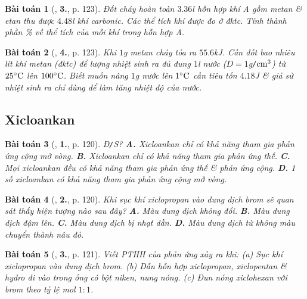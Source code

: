 \documentclass{article}
\numberwithin{equation}{section}
\newtheorem{baitoan}{Bài toán}[section]
\begin{document}
\begin{baitoan}[\cite{SGK_Hoa_Hoc_11_co_ban}, \textbf{3.}, p. 123]
	Đốt cháy hoàn toàn $3.36$\emph{l} hỗn hợp khí A gồm metan \& etan thu được $4.48$\emph{l} khí carbonic. Các thể tích khí được đo ở đktc. Tính thành phần \% về thể tích của mỗi khí trong hỗn hợp A.
\end{baitoan}

\begin{baitoan}[\cite{SGK_Hoa_Hoc_11_co_ban}, \textbf{4.}, p. 123]
	Khi $1$\emph{g} metan cháy tỏa ra $55.6$\emph{kJ}. Cần đốt bao nhiêu lít khí metan (đktc) để lượng nhiệt sinh ra đủ đung $1$\emph{l} nước ($D = 1$\emph{g\texttt{/}$\rm cm^3$}) từ $25^\circ{\rm C}$ lên $100^\circ{\rm C}$. Biết muốn nâng $1$\emph{g} nước lên $1^\circ{\rm C}$ cần tiêu tốn $4.18$\emph{J} \& giả sử nhiệt sinh ra chỉ dùng để làm tăng nhiệt độ của nước.
\end{baitoan}


\subsection{Xicloankan}

\begin{baitoan}[\cite{SGK_Hoa_Hoc_11_co_ban}, \textbf{1.}, p. 120]
	\emph{Đ\texttt{/}S}? {\bf A.} Xicloankan chỉ có khả năng tham gia phản ứng cộng mở vòng. {\bf B.} Xicloankan chỉ có khả năng tham gia phản ứng thế. {\bf C.} Mọi xicloankan đều có khả năng tham gia phản ứng thế \& phản ứng cộng. {\bf D.} 1 số xicloankan có khả năng tham gia phản ứng cộng mở vòng.
\end{baitoan}

\begin{baitoan}[\cite{SGK_Hoa_Hoc_11_co_ban}, \textbf{2.}, p. 120]
	Khi sục khí xiclopropan vào dung dịch brom sẽ quan sát thấy hiện tượng nào sau đây? {\bf A.} Màu dung dịch không đổi. {\bf B.} Màu dung dịch đậm lên. {\bf C.} Màu dung dịch bị nhạt dần. {\bf D.} Màu dung dịch từ không màu chuyển thành nâu đỏ.
\end{baitoan}

\begin{baitoan}[\cite{SGK_Hoa_Hoc_11_co_ban}, \textbf{3.}, p. 121]
	Viết PTHH của phản ứng xảy ra khi: (a) Sục khí xiclopropan vào dung dịch brom. (b) Dẫn hỗn hợp xiclopropan, xiclopentan \& hydro đi vào trong ống có bột niken, nung nóng. (c) Đun nóng xiclohexan với brom theo tỷ lệ mol $1:1$.
\end{baitoan}
\end{document}
